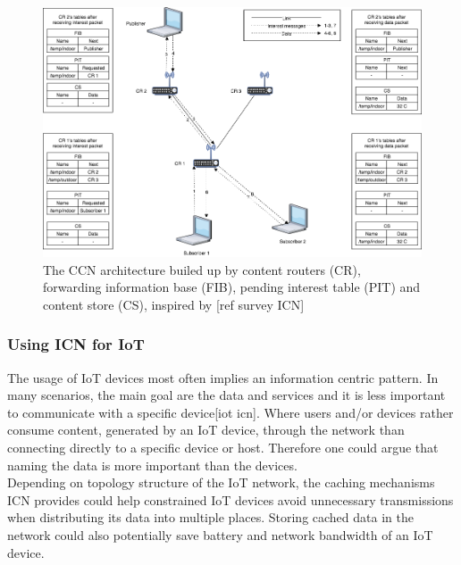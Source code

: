 \begin{figure}
	\includegraphics[width=\textwidth]{figures/CCN-architecture.png}
	\caption{The CCN architecture builed up by content routers (CR), forwarding information base (FIB), pending interest table (PIT) and content store (CS), inspired by [ref survey ICN]}
	\label{fig:CCN-architecture}
\end{figure}



\subsubsection{Using ICN for IoT}
The usage of IoT devices most often implies an information centric pattern. In many scenarios, the main goal are the data and services and it is less important to communicate with a specific device[iot icn]. Where users and/or devices rather consume content, generated by an IoT device, through the network than connecting directly to a specific device or host. Therefore one could argue that naming the data is more important than the devices.\\
Depending on topology structure of the IoT network, the caching mechanisms ICN provides could help constrained IoT devices avoid unnecessary transmissions when distributing its data into multiple places. Storing cached data in the network could also potentially save battery and network bandwidth of an IoT device.




